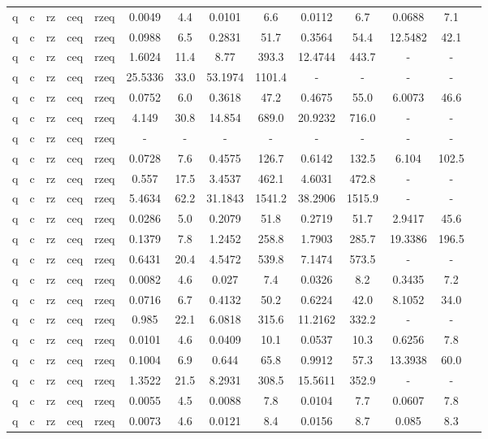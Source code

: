 \begin{table}[htb]
{\begin{tabular}{|c|c|c|c|c|c|c|c|c|c|c|c|c|c|}
q & c & rz & ceq & rzeq & 0.0049 & 4.4 & 0.0101 & 6.6 & 0.0112 & 6.7 & 0.0688 & 7.1 \\ 
q & c & rz & ceq & rzeq & 0.0988 & 6.5 & 0.2831 & 51.7 & 0.3564 & 54.4 & 12.5482 & 42.1 \\ 
q & c & rz & ceq & rzeq & 1.6024 & 11.4 & 8.77 & 393.3 & 12.4744 & 443.7 & - & - \\ 
q & c & rz & ceq & rzeq & 25.5336 & 33.0 & 53.1974 & 1101.4 & - & - & - & - \\ 
q & c & rz & ceq & rzeq & 0.0752 & 6.0 & 0.3618 & 47.2 & 0.4675 & 55.0 & 6.0073 & 46.6 \\ 
q & c & rz & ceq & rzeq & 4.149 & 30.8 & 14.854 & 689.0 & 20.9232 & 716.0 & - & - \\ 
q & c & rz & ceq & rzeq & - & - & - & - & - & - & - & - \\ 
q & c & rz & ceq & rzeq & 0.0728 & 7.6 & 0.4575 & 126.7 & 0.6142 & 132.5 & 6.104 & 102.5 \\ 
q & c & rz & ceq & rzeq & 0.557 & 17.5 & 3.4537 & 462.1 & 4.6031 & 472.8 & - & - \\ 
q & c & rz & ceq & rzeq & 5.4634 & 62.2 & 31.1843 & 1541.2 & 38.2906 & 1515.9 & - & - \\ 
q & c & rz & ceq & rzeq & 0.0286 & 5.0 & 0.2079 & 51.8 & 0.2719 & 51.7 & 2.9417 & 45.6 \\ 
q & c & rz & ceq & rzeq & 0.1379 & 7.8 & 1.2452 & 258.8 & 1.7903 & 285.7 & 19.3386 & 196.5 \\ 
q & c & rz & ceq & rzeq & 0.6431 & 20.4 & 4.5472 & 539.8 & 7.1474 & 573.5 & - & - \\ 
q & c & rz & ceq & rzeq & 0.0082 & 4.6 & 0.027 & 7.4 & 0.0326 & 8.2 & 0.3435 & 7.2 \\ 
q & c & rz & ceq & rzeq & 0.0716 & 6.7 & 0.4132 & 50.2 & 0.6224 & 42.0 & 8.1052 & 34.0 \\ 
q & c & rz & ceq & rzeq & 0.985 & 22.1 & 6.0818 & 315.6 & 11.2162 & 332.2 & - & - \\ 
q & c & rz & ceq & rzeq & 0.0101 & 4.6 & 0.0409 & 10.1 & 0.0537 & 10.3 & 0.6256 & 7.8 \\ 
q & c & rz & ceq & rzeq & 0.1004 & 6.9 & 0.644 & 65.8 & 0.9912 & 57.3 & 13.3938 & 60.0 \\ 
q & c & rz & ceq & rzeq & 1.3522 & 21.5 & 8.2931 & 308.5 & 15.5611 & 352.9 & - & - \\ 
q & c & rz & ceq & rzeq & 0.0055 & 4.5 & 0.0088 & 7.8 & 0.0104 & 7.7 & 0.0607 & 7.8 \\ 
q & c & rz & ceq & rzeq & 0.0073 & 4.6 & 0.0121 & 8.4 & 0.0156 & 8.7 & 0.085 & 8.3 \\ 

\end{tabular}}
\end{table}
